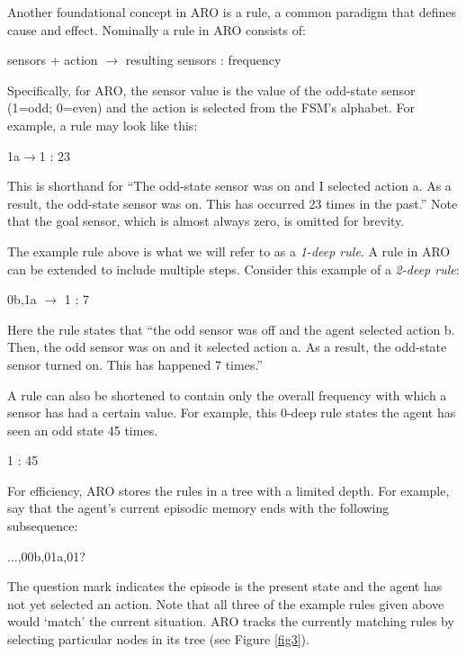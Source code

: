 \documentclass[letterpaper]{article} %
\begin{document}
Another foundational concept in ARO is a rule, a common paradigm that
defines cause and effect.  Nominally a rule in ARO consists of:

    sensors + action $\rightarrow$ resulting sensors : frequency

Specifically, for ARO, the sensor value is the value of the odd-state
sensor (1=odd; 0=even) and the action is selected from the FSM's
alphabet. For example, a rule may look like this:

\begin{center}
    1a$\rightarrow$1 : 23
\end{center}

This is shorthand for ``The odd-state sensor was on and I selected
action a.  As a result, the odd-state sensor was on.  This has
occurred 23 times in the past.''  Note that the goal sensor, which is
almost always zero, is omitted for brevity.

The example rule above is what we will refer to as a \textit{1-deep rule}.  A
rule in ARO can be extended to include multiple steps.  Consider this
example of a \textit{2-deep rule}:

\begin{center}
   0b,1a $\rightarrow$ 1 : 7
\end{center}

Here the rule states that ``the odd sensor was off and the agent
selected action b.  Then, the odd sensor was on and it selected
action a.  As a result, the odd-state sensor turned on.  This has
happened 7 times.''

A rule can also be shortened to contain only the overall frequency
with which a sensor has had a certain value.  For example, this 0-deep
rule states the agent has seen an odd state 45 times.

\begin{center}
    1 : 45
\end{center}

For efficiency, ARO stores the rules in a tree with a limited depth.
For example, say that the agent's current episodic memory ends with
the following subsequence:

\begin{center}
    ...,00b,01a,01?
\end{center}
    
The question mark indicates the episode is the present state and the
agent has not yet selected an action.  Note that all three of the
example rules given above would `match' the current situation.  ARO
tracks the currently matching rules by selecting particular nodes in
its tree (see Figure \ref{fig3}).
\end{document}

